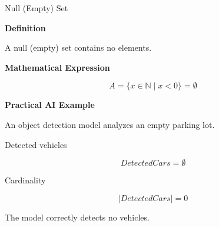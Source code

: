 \documentclass[aspectratio=169]{beamer}
\begin{document}
\begin{frame}{Null (Empty) Set}

\textbf{Definition}

A null (empty) set contains no elements.

\vspace{0.4cm}

\textbf{Mathematical Expression}

\[
A=\{x\in\mathbb N\mid x<0\}
=\emptyset
\]

\vspace{0.4cm}

\textbf{Practical AI Example}

An object detection model analyzes an empty parking lot.

Detected vehicles

\[
DetectedCars=\emptyset
\]

Cardinality

\[
|DetectedCars|=0
\]

The model correctly detects no vehicles.
\vspace{0.3cm}


\end{frame}
\end{document}
